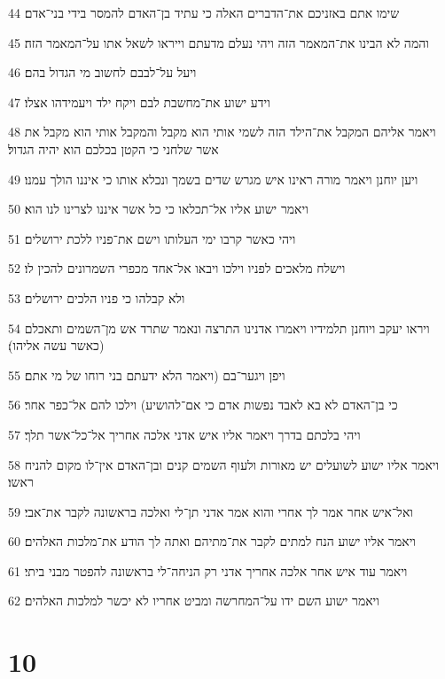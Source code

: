\par 44 שימו אתם באזניכם את־הדברים האלה כי עתיד בן־האדם להמסר בידי בני־אדם׃
\par 45 והמה לא הבינו את־המאמר הזה ויהי נעלם מדעתם וייראו לשאל אתו על־המאמר הזה׃
\par 46 ויעל על־לבבם לחשוב מי הגדול בהם׃
\par 47 וידע ישוע את־מחשבת לבם ויקח ילד ויעמידהו אצלו׃
\par 48 ויאמר אליהם המקבל את־הילד הזה לשמי אותי הוא מקבל והמקבל אותי הוא מקבל את אשר שלחני כי הקטן בכלכם הוא יהיה הגדול׃
\par 49 ויען יוחנן ויאמר מורה ראינו איש מגרש שדים בשמך ונכלא אותו כי איננו הולך עמנו׃
\par 50 ויאמר ישוע אליו אל־תכלאו כי כל אשר איננו לצרינו לנו הוא׃
\par 51 ויהי כאשר קרבו ימי העלותו וישם את־פניו ללכת ירושלים׃
\par 52 וישלח מלאכים לפניו וילכו ויבאו אל־אחד מכפרי השמרונים להכין לו׃
\par 53 ולא קבלהו כי פניו הלכים ירושלים׃
\par 54 ויראו יעקב ויוחנן תלמידיו ויאמרו אדנינו התרצה ונאמר שתרד אש מן־השמים ותאכלם (כאשר עשה אליהו)׃
\par 55 ויפן ויגער־בם (ויאמר הלא ידעתם בני רוחו של מי אתם׃
\par 56 כי בן־האדם לא בא לאבד נפשות אדם כי אם־להושיע) וילכו להם אל־כפר אחר׃
\par 57 ויהי בלכתם בדרך ויאמר אליו איש אדני אלכה אחריך אל־כל־אשר תלך׃
\par 58 ויאמר אליו ישוע לשועלים יש מאורות ולעוף השמים קנים ובן־האדם אין־לו מקום להניח ראשו׃
\par 59 ואל־איש אחר אמר לך אחרי והוא אמר אדני תן־לי ואלכה בראשונה לקבר את־אבי׃
\par 60 ויאמר אליו ישוע הנח למתים לקבר את־מתיהם ואתה לך הודע את־מלכות האלהים׃
\par 61 ויאמר עוד איש אחר אלכה אחריך אדני רק הניחה־לי בראשונה להפטר מבני ביתי׃
\par 62 ויאמר ישוע השם ידו על־המחרשה ומביט אחריו לא יכשר למלכות האלהים׃

\chapter{10}

